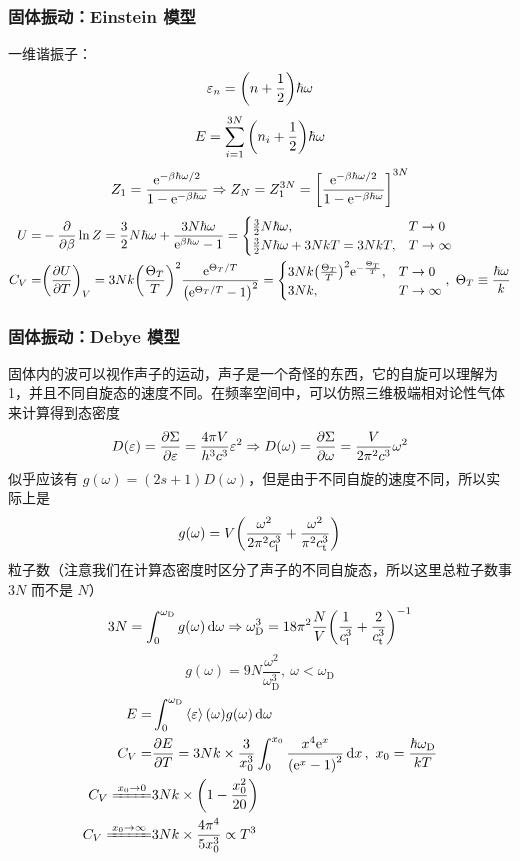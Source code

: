 \subsubsection{固体振动：Einstein 模型}

一维谐振子：\[
\varepsilon_n = \qty(n + \frac{1}{2}) \hbar \omega
\] \[
E = \sum_{i = 1}^{3 N} \qty(n_i + \frac{1}{2}) \hbar \omega
\] \[
Z_1 = \frac{\mathrm{e}^{- \beta \hbar \omega / 2}}{1 - \mathrm{e}^{- \beta \hbar \omega}} \Rightarrow Z_N = Z_1^{3 N} = \qty[\frac{\mathrm{e}^{- \beta \hbar \omega / 2}}{1 - \mathrm{e}^{- \beta \hbar \omega}}]^{3 N}
\] \begin{align*}
U = & - \pdv{\beta} \ln{Z} = \frac{3}{2} N \hbar \omega + \frac{3 N \hbar \omega}{\mathrm{e}^{\beta \hbar \omega} - 1} = \begin{cases}
\frac{3}{2} N \hbar \omega, & T \to 0\\
\frac{3}{2} N \hbar \omega + 3 N k T = 3 N k T, & T \to \infty
\end{cases}\\
C_V = & \qty(\pdv{U}{T})_V = 3 N k \qty(\frac{\Theta_T}{T})^2 \frac{\mathrm{e}^{\Theta_T / T}}{\qty(\mathrm{e}^{\Theta_T / T} - 1)^2} = \begin{cases}
3 N k \qty(\frac{\Theta_T}{T})^2 \mathrm{e}^{- \frac{\Theta_T}{T}}, & T \to 0\\
3 N k, & T \to \infty
\end{cases} ,\ \Theta_T \equiv \frac{\hbar \omega}{k}
\end{align*}

\subsubsection{固体振动：Debye 模型}

固体内的波可以视作声子的运动，声子是一个奇怪的东西，它的自旋可以理解为 1，并且不同自旋态的速度不同。在频率空间中，可以仿照三维极端相对论性气体来计算得到态密度 \[
D(\varepsilon) = \pdv{\Sigma}{\varepsilon} = \frac{4 \pi V}{h^3 c^3} \varepsilon^2 \Rightarrow D(\omega) = \pdv{\Sigma}{\omega} = \frac{V}{2 \pi^2 c^3} \omega^2
\] 似乎应该有 $g(\omega) = (2 s + 1) D(\omega)$，但是由于不同自旋的速度不同，所以实际上是 \[
g(\omega) = V \qty(\frac{\omega^2}{2 \pi^2 c_{\text{l}}^3} + \frac{\omega^2}{\pi^2 c_{\text{t}}^3})
\]
粒子数（注意我们在计算态密度时区分了声子的不同自旋态，所以这里总粒子数事 $3 N$ 而不是 $N$） \[
3 N = \int_0^{\omega_{\text{D}}} g(\omega) \dd{\omega} \Rightarrow \omega_{\text{D}}^3 = 18 \pi^2 \frac{N}{V} \qty(\frac{1}{c_{\text{l}}^3} + \frac{2}{c_{\text{t}}^3})^{- 1}\] \[g(\omega) = 9 N \frac{\omega^2}{\omega_{\text{D}}^3},\ \omega < \omega_{\text{D}}
\] \begin{align*}
E = & \int_0^{\omega_{\text{D}}} \expval{\varepsilon} (\omega) g(\omega) \dd{\omega}\\
C_V = & \pdv{E}{T} = 3 N k \times \frac{3}{x_0^3} \int_0^{x_0} \frac{x^4 \mathrm{e}^{x}}{\qty(\mathrm{e}^{x} - 1)^2} \dd{x},\ x_0 = \frac{\hbar \omega_{\text{D}}}{k T}\\
C_V \xlongequal{x_0 \to 0} & 3 N k \times \qty(1 - \frac{x_0^2}{20})\\
C_V \xlongequal{x_0 \to \infty} & 3 N k \times \frac{4 \pi^4}{5 x_0^3} \propto T^3
\end{align*}

